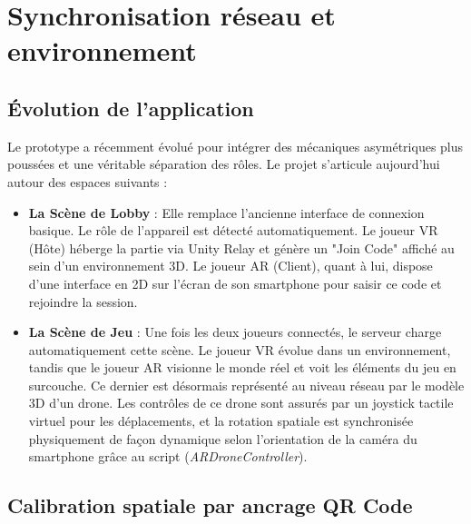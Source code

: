 \documentclass[12pt, a4paper]{article}
\begin{document}
\section{Synchronisation réseau et environnement}

\subsection{Évolution de l'application}

Le prototype a récemment évolué pour intégrer des mécaniques asymétriques plus poussées et une véritable séparation des rôles. Le projet s'articule aujourd'hui autour des espaces suivants :

\begin{itemize}
  \item \textbf{La Scène de Lobby} : Elle remplace l'ancienne interface de connexion basique. Le rôle de l'appareil est détecté automatiquement. Le joueur VR (Hôte) héberge la partie via Unity Relay et génère un "Join Code" affiché au sein d'un environnement 3D. Le joueur AR (Client), quant à lui, dispose d'une interface en 2D sur l'écran de son smartphone pour saisir ce code et rejoindre la session.
  
  \item \textbf{La Scène de Jeu} : Une fois les deux joueurs connectés, le serveur charge automatiquement cette scène. Le joueur VR évolue dans un environnement, tandis que le joueur AR visionne le monde réel et voit les éléments du jeu en surcouche. Ce dernier est désormais représenté au niveau réseau par le modèle 3D d'un drone. Les contrôles de ce drone sont assurés par un joystick tactile virtuel pour les déplacements, et la rotation spatiale est synchronisée physiquement de façon dynamique selon l'orientation de la caméra du smartphone grâce au script (\textit{ARDroneController}).
\end{itemize}

\subsection{Calibration spatiale par ancrage QR Code}
\end{document}
